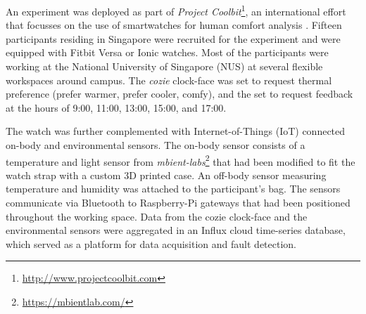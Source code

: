 
An experiment was deployed as part of \emph{Project Coolbit}\footnote{\url{http://www.projectcoolbit.com}}, an international effort that focusses on the use of smartwatches for human comfort analysis \cite{nazarian2019geophysics}. Fifteen participants residing in Singapore were recruited for the experiment and were equipped with Fitbit Versa or Ionic watches. Most of the participants were working at the National University of Singapore (NUS) at several flexible workspaces around campus.  The \emph{cozie} clock-face was set to request thermal preference (prefer warmer, prefer cooler, comfy), and the set to request feedback at the hours of 9:00, 11:00, 13:00, 15:00, and 17:00. 

The watch was further complemented with Internet-of-Things (IoT) connected on-body and environmental sensors. The on-body sensor consists of a temperature and light sensor from \emph{mbient-labs}\footnote{\url{https://mbientlab.com/}} that had been modified to fit the watch strap with a custom 3D printed case. An off-body sensor measuring temperature and humidity was attached to the participant's bag. The sensors communicate via Bluetooth to Raspberry-Pi gateways that had been positioned throughout the working space. Data from the cozie clock-face and the environmental sensors were aggregated in an Influx cloud time-series database, which served as a platform for data acquisition and fault detection. 
